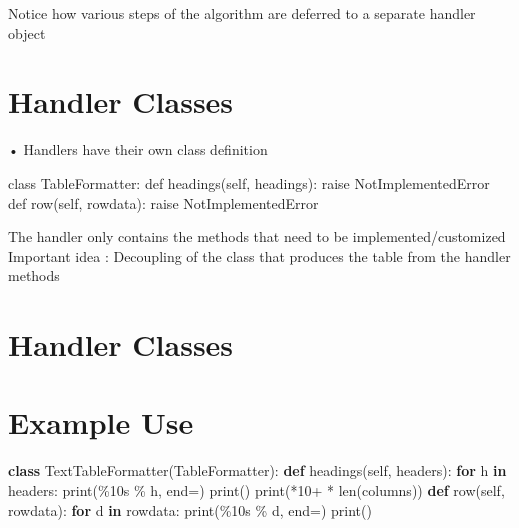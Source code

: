 \documentclass[
  letterpaper,
  DIV=11,
  numbers=noendperiod]{scrreprt}
\newenvironment{Shaded}{\begin{snugshade}}{\end{snugshade}}
\newcommand{\BuiltInTok}[1]{\textcolor[rgb]{0.00,0.23,0.31}{#1}}
\newcommand{\ControlFlowTok}[1]{\textcolor[rgb]{0.00,0.23,0.31}{\textbf{#1}}}
\newcommand{\KeywordTok}[1]{\textcolor[rgb]{0.00,0.23,0.31}{\textbf{#1}}}
\newcommand{\NormalTok}[1]{\textcolor[rgb]{0.00,0.23,0.31}{#1}}
\newcommand{\OperatorTok}[1]{\textcolor[rgb]{0.37,0.37,0.37}{#1}}
\newcommand{\SpecialCharTok}[1]{\textcolor[rgb]{0.37,0.37,0.37}{#1}}
\newcommand{\StringTok}[1]{\textcolor[rgb]{0.13,0.47,0.30}{#1}}
\newcommand{\VariableTok}[1]{\textcolor[rgb]{0.07,0.07,0.07}{#1}}
\begin{document}
Notice how various steps of the algorithm are deferred to a separate
handler object


\chapter{Handler Classes}\label{handler-classes-2}

• Handlers have their own class definition

class TableFormatter: def headings(self, headings): raise
NotImplementedError def row(self, rowdata): raise NotImplementedError

The handler only contains the methods that need to be
implemented/customized\\
Important idea : Decoupling of the class that produces the table from
the handler methods


\chapter{Handler Classes}\label{handler-classes-3}


\chapter{Example Use}\label{example-use-2}

\begin{Shaded}
\begin{Highlighting}[]
\KeywordTok{class}\NormalTok{ TextTableFormatter(TableFormatter): }\KeywordTok{def}\NormalTok{ headings(}\VariableTok{self}\NormalTok{, headers): }\ControlFlowTok{for}\NormalTok{ h }\KeywordTok{in}\NormalTok{ headers: }\BuiltInTok{print}\NormalTok{(}\StringTok{\textquotesingle{}}\SpecialCharTok{\%10s}\StringTok{\textquotesingle{}} \OperatorTok{\%}\NormalTok{ h, end}\OperatorTok{=}\StringTok{\textquotesingle{}\textquotesingle{}}\NormalTok{) }\BuiltInTok{print}\NormalTok{() }\BuiltInTok{print}\NormalTok{(}\StringTok{\textquotesingle{}{-}*10+\textquotesingle{}} \OperatorTok{*} \BuiltInTok{len}\NormalTok{(columns)) }\KeywordTok{def}\NormalTok{ row(}\VariableTok{self}\NormalTok{, rowdata): }\ControlFlowTok{for}\NormalTok{ d }\KeywordTok{in}\NormalTok{ rowdata: }\BuiltInTok{print}\NormalTok{(}\StringTok{\textquotesingle{}}\SpecialCharTok{\%10s}\StringTok{\textquotesingle{}} \OperatorTok{\%}\NormalTok{ d, end}\OperatorTok{=}\StringTok{\textquotesingle{}\textquotesingle{}}\NormalTok{) }\BuiltInTok{print}\NormalTok{() }
\end{Highlighting}
\end{Shaded}
\end{document}
